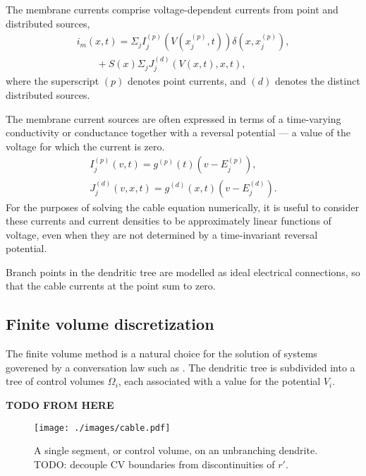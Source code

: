 The membrane currents comprise voltage-dependent currents from point and
distributed sources,
\begin{equation}
\begin{split}
    i_m(x, t) = \Sigma_j I^{(p)}_j(V(x^{(p)}_j, t)) \delta(x, x^{(p)}_j), \\
\qquad
    + S(x) \Sigma_j J^{(d)}_j(V(x, t), x, t),
\end{split}
\end{equation}
where the superscript $(p)$ denotes point currents, and $(d)$ denotes the
distinct distributed sources.

The membrane current sources are often expressed in terms of a time-varying
conductivity or conductance together with a reversal potential --- a value of
the voltage for which the current is zero.
\begin{gather}
    I^{(p)}_j(v, t) = g^{(p)}(t)(v - E^{(p)}_j), \\
    J^{(d)}_j(v, x, t) = g^{(d)}(x, t)(v - E^{(d)}_j).
\end{gather}
For the purposes of solving the cable equation numerically, it is useful to
consider these currents and current densities to be approximately linear
functions of voltage, even when they are not determined by a time-invariant
reversal potential.

Branch points in the dendritic tree are modelled as ideal electrical connections,
so that the cable currents at the point sum to zero.

\subsection{Finite volume discretization}

The finite volume method is a natural choice for the solution of systems goverened
by a conversation law such as . The dendritic tree is subdivided
into a tree of control volumes $\Omega_i$, each associated with a value for the
potential $V_i$.

\textbf{TODO FROM HERE}

\begin{figure}
    \begin{center}
        \texttt{[image: ./images/cable.pdf]}
    \end{center}
    \caption{A single segment, or control volume, on an unbranching dendrite. TODO: decouple CV boundaries from discontinuities of $r'$.}
    \label{fig:segment}
\end{figure}

